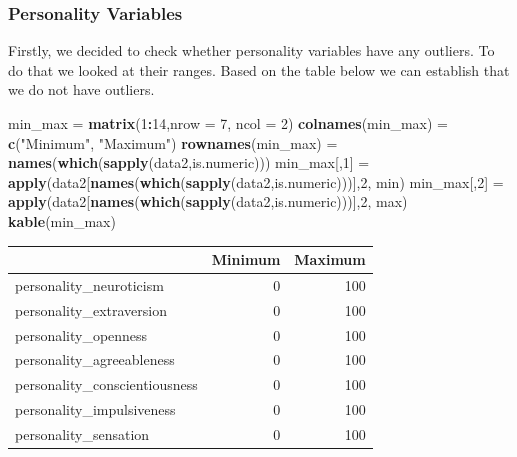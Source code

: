 \documentclass[
]{article}
\newenvironment{Shaded}{\begin{snugshade}}{\end{snugshade}}
\newcommand{\CommentTok}[1]{\textcolor[rgb]{0.56,0.35,0.01}{\textit{#1}}}
\newcommand{\DataTypeTok}[1]{\textcolor[rgb]{0.13,0.29,0.53}{#1}}
\newcommand{\DecValTok}[1]{\textcolor[rgb]{0.00,0.00,0.81}{#1}}
\newcommand{\KeywordTok}[1]{\textcolor[rgb]{0.13,0.29,0.53}{\textbf{#1}}}
\newcommand{\NormalTok}[1]{#1}
\newcommand{\OperatorTok}[1]{\textcolor[rgb]{0.81,0.36,0.00}{\textbf{#1}}}
\newcommand{\StringTok}[1]{\textcolor[rgb]{0.31,0.60,0.02}{#1}}
\begin{document}
\begin{Shaded}
\begin{Highlighting}[]
{{{\CommentTok{# Dropping "Consumption Chocolate" and "Consumption Caffeine" variables}
\NormalTok{data2 =}\StringTok{ }\NormalTok{data2[,}\OperatorTok{-}\KeywordTok{c}\NormalTok{(}\DecValTok{14}\NormalTok{,}\DecValTok{16}\NormalTok{)]}
\end{Highlighting}
\end{Shaded}

\hypertarget{personality-variables}{%
\subsubsection{Personality Variables}\label{personality-variables}}

Firstly, we decided to check whether personality variables have any
outliers. To do that we looked at their ranges. Based on the table below
we can establish that we do not have outliers.

\begin{Shaded}
\begin{Highlighting}[]
\NormalTok{min_max =}\StringTok{ }\KeywordTok{matrix}\NormalTok{(}\DecValTok{1}\OperatorTok{:}\DecValTok{14}\NormalTok{,}\DataTypeTok{nrow =} \DecValTok{7}\NormalTok{, }\DataTypeTok{ncol =} \DecValTok{2}\NormalTok{)}
\KeywordTok{colnames}\NormalTok{(min_max) =}\StringTok{ }\KeywordTok{c}\NormalTok{(}\StringTok{"Minimum"}\NormalTok{, }\StringTok{"Maximum"}\NormalTok{)}
\KeywordTok{rownames}\NormalTok{(min_max) =}\StringTok{ }\KeywordTok{names}\NormalTok{(}\KeywordTok{which}\NormalTok{(}\KeywordTok{sapply}\NormalTok{(data2,is.numeric)))}
\NormalTok{min_max[,}\DecValTok{1}\NormalTok{] =}\StringTok{ }\KeywordTok{apply}\NormalTok{(data2[}\KeywordTok{names}\NormalTok{(}\KeywordTok{which}\NormalTok{(}\KeywordTok{sapply}\NormalTok{(data2,is.numeric)))],}\DecValTok{2}\NormalTok{, min)}
\NormalTok{min_max[,}\DecValTok{2}\NormalTok{] =}\StringTok{ }\KeywordTok{apply}\NormalTok{(data2[}\KeywordTok{names}\NormalTok{(}\KeywordTok{which}\NormalTok{(}\KeywordTok{sapply}\NormalTok{(data2,is.numeric)))],}\DecValTok{2}\NormalTok{, max)}
\KeywordTok{kable}\NormalTok{(min_max)}
\end{Highlighting}
\end{Shaded}

\begin{longtable}[]{@{}lrr@{}}
\toprule
& Minimum & Maximum\tabularnewline
\midrule
\endhead
personality\_neuroticism & 0 & 100\tabularnewline
personality\_extraversion & 0 & 100\tabularnewline
personality\_openness & 0 & 100\tabularnewline
personality\_agreeableness & 0 & 100\tabularnewline
personality\_conscientiousness & 0 & 100\tabularnewline
personality\_impulsiveness & 0 & 100\tabularnewline
personality\_sensation & 0 & 100\tabularnewline
\bottomrule
\end{longtable}
\end{document}
